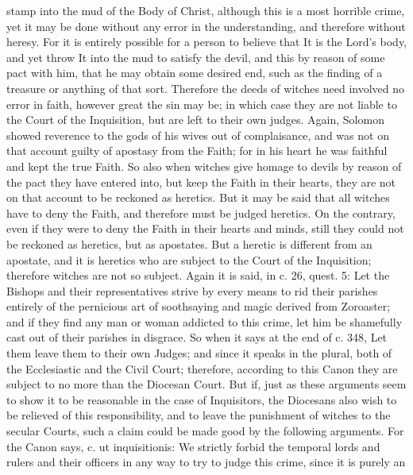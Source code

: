        stamp into the mud of the Body of Christ, although this is a most horrible crime, yet it may
       be done without any error in the understanding, and therefore without heresy. For it is
       entirely possible for a person to believe that It is the Lord's body, and yet throw It into the
       mud to satisfy the devil, and this by reason of some pact with him, that he may obtain some
       desired end, such as the finding of a treasure or anything of that sort. Therefore the deeds of
       witches need involved no error in faith, however great the sin may be; in which case they
       are not liable to the Court of the Inquisition, but are left to their own judges.
             Again, Solomon showed reverence to the gods of his wives out of complaisance, and
       was not on that account guilty of apostasy from the Faith; for in his heart he was faithful and
       kept the true Faith. So also when witches give homage to devils by reason of the pact they
       have entered into, but keep the Faith in their hearts, they are not on that account to be
       reckoned as heretics.
             But it may be said that all witches have to deny the Faith, and therefore must be judged
       heretics. On the contrary, even if they were to deny the Faith in their hearts and minds, still
       they could not be reckoned as heretics, but as apostates. But a heretic is different from an
       apostate, and it is heretics who are subject to the Court of the Inquisition; therefore witches
       are not so subject.
             Again it is said, in c. 26, quest. 5: Let the Bishops and their representatives strive by
       every means to rid their parishes entirely of the pernicious art of soothsaying and magic
       derived from Zoroaster; and if they find any man or woman addicted to this crime, let him
       be shamefully cast out of their parishes in disgrace. So when it says at the end of c. 348, Let
       them leave them to their own Judges; and since it speaks in the plural, both of the
       Ecclesiastic and the Civil Court; therefore, according to this Canon they are subject to no
       more than the Diocesan Court.
             But if, just as these arguments seem to show it to be reasonable in the case of
       Inquisitors, the Diocesans also wish to be relieved of this responsibility, and to leave the
       punishment of witches to the secular Courts, such a claim could be made good by the
       following arguments. For the Canon says, c. ut inquisitionis: We strictly forbid the temporal
       lords and rulers and their officers in any way to try to judge this crime, since it is purely an
